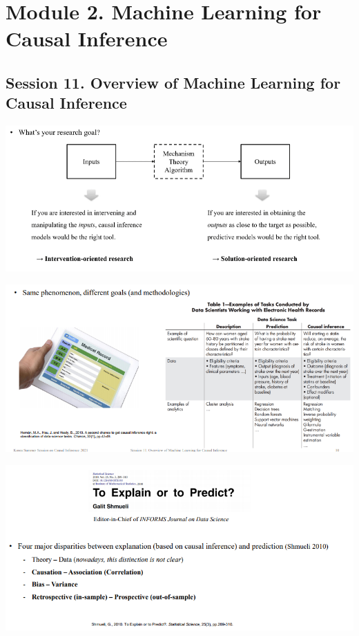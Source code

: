 \documentclass[
]{book}
\theoremstyle{definition}
\theoremstyle{definition}
\theoremstyle{definition}
\theoremstyle{definition}
\theoremstyle{remark}
\begin{document}
\hypertarget{module-2.-machine-learning-for-causal-inference}{%
\section{Module 2. Machine Learning for Causal Inference}\label{module-2.-machine-learning-for-causal-inference}}

\hypertarget{session-11.-overview-of-machine-learning-for-causal-inference}{%
\subsection{Session 11. Overview of Machine Learning for Causal Inference}\label{session-11.-overview-of-machine-learning-for-causal-inference}}

\includegraphics{figures/58.png}

\includegraphics{figures/59.png}

\includegraphics{figures/60.png}
\end{document}
